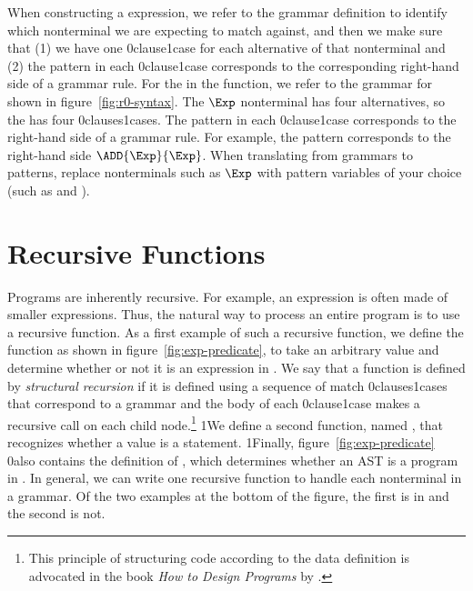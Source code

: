 \documentclass[7x10]{TimesAPriori_MIT}%
\def\racketEd{0}
\def\pythonEd{1}
\def\edition{1}
\newcommand{\racket}[1]{{\if\edition\racketEd{#1}\fi}}
\newcommand{\pythonColor}[0]{}
\newcommand{\python}[1]{{\if\edition\pythonEd\pythonColor #1\fi}}
\numberwithin{theorem}{chapter}
\numberwithin{definition}{chapter}
\numberwithin{equation}{chapter}
\begin{document}
When constructing a  expression, we refer to the grammar
definition to identify which nonterminal we are expecting to match
against, and then we make sure that (1) we have one
\racket{clause}\python{case} for each alternative of that nonterminal
and (2) the pattern in each \racket{clause}\python{case}
corresponds to the corresponding right-hand side of a grammar
rule. For the  in the  function, we refer to
the grammar for \LangInt{} shown in figure~\ref{fig:r0-syntax}. The $\Exp$
nonterminal has four alternatives, so the  has four
\racket{clauses}\python{cases}.  The pattern in each
\racket{clause}\python{case} corresponds to the right-hand side of a
grammar rule. For example, the pattern 
corresponds to the right-hand side $\ADD{\Exp}{\Exp}$. When
translating from grammars to patterns, replace nonterminals such as
$\Exp$ with pattern variables of your choice (such as  and
).


\section{Recursive Functions}
\label{sec:recursion}

Programs are inherently recursive. For example, an expression is often
made of smaller expressions. Thus, the natural way to process an
entire program is to use a recursive function.  As a first example of
such a recursive function, we define the function  as
shown in figure~\ref{fig:exp-predicate}, to take an arbitrary
value and determine whether or not it is an expression in \LangInt{}.
%
We say that a function is defined by \emph{structural recursion} if
it is defined using a sequence of match \racket{clauses}\python{cases}
that correspond to a grammar and the body of each
\racket{clause}\python{case} makes a recursive call on each child
node.\footnote{This principle of structuring code according to the
  data definition is advocated in the book \emph{How to Design
    Programs} by \citet{Felleisen:2001aa}.}  \python{We define a
  second function, named , that recognizes whether a value
  is a \LangInt{} statement.}  \python{Finally, }
figure~\ref{fig:exp-predicate} \racket{also} contains the definition of
, which determines whether an AST is a program in \LangInt{}.
In general, we can write one recursive function to handle each
nonterminal in a grammar. Of the
two examples at the bottom of the figure, the first is in
\LangInt{} and the second is not.
\end{document}
